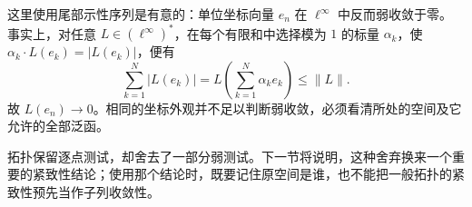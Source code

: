 \ProseParagraphBreak

这里使用尾部示性序列是有意的：单位坐标向量 \(e_n\) 在 \(\ell^\infty\) 中反而弱收敛于零。事实上，对任意 \(L\in(\ell^\infty)^*\)，在每个有限和中选择模为 \(1\) 的标量 \(\alpha_k\)，使 \(\alpha_k\cdot L(e_k)=|L(e_k)|\)，便有
\[
 \sum_{k=1}^N|L(e_k)|
 =L\left(\sum_{k=1}^N\alpha_ke_k\right)\leq\|L\|.
\]
故 \(L(e_n)\to0\)。相同的坐标外观并不足以判断弱收敛，必须看清所处的空间及它允许的全部泛函。

\ProseParagraphBreak

\WeakStar{}拓扑保留逐点测试，却舍去了一部分弱测试。下一节将说明，这种舍弃换来一个重要的紧致性结论；使用那个结论时，既要记住原空间是谁，也不能把一般拓扑的紧致性预先当作子列收敛性。
